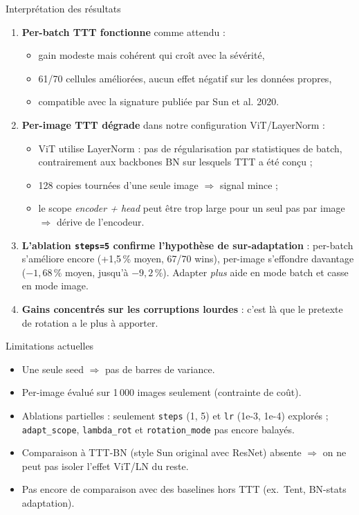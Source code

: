 \documentclass[10pt,aspectratio=169]{beamer}
\newcommand{\code}[1]{\texttt{\small #1}}
\begin{document}
\begin{frame}{Interprétation des résultats}
  \begin{enumerate}
    \item \textbf{Per-batch TTT fonctionne} comme attendu :
    \begin{itemize}\small
      \item gain modeste mais cohérent qui croît avec la sévérité,
      \item 61/70 cellules améliorées, aucun effet négatif sur les données propres,
      \item compatible avec la signature publiée par Sun et al. 2020.
    \end{itemize}

    \item \textbf{Per-image TTT dégrade} dans notre configuration ViT/LayerNorm :
    \begin{itemize}\small
      \item ViT utilise \alert{LayerNorm} : pas de régularisation par statistiques de batch, contrairement aux backbones BN sur lesquels TTT a été conçu ;
      \item 128 copies tournées d'une seule image $\Rightarrow$ signal mince ;
      \item le scope \emph{encoder + head} peut être trop large pour un seul pas par image $\Rightarrow$ dérive de l'encodeur.
    \end{itemize}

    \item \textbf{L'ablation \code{steps=5} confirme l'hypothèse de sur-adaptation} : per-batch s'améliore encore (+1,5\,\% moyen, 67/70 wins), per-image s'effondre davantage ($-1{,}68\,\%$ moyen, jusqu'à $-9{,}2\,\%$). Adapter \emph{plus} aide en mode batch et casse en mode image.

    \item \textbf{Gains concentrés sur les corruptions lourdes} : c'est là que le pretexte de rotation a le plus à apporter.
  \end{enumerate}
\end{frame}

\begin{frame}{Limitations actuelles}
  \begin{itemize}
    \item Une seule seed $\Rightarrow$ pas de barres de variance.
    \item Per-image évalué sur 1\,000 images seulement (contrainte de coût).
    \item Ablations partielles : seulement \code{steps} (1, 5) et \code{lr} (1e-3, 1e-4) explorés ; \code{adapt\_scope}, \code{lambda\_rot} et \code{rotation\_mode} pas encore balayés.
    \item Comparaison à TTT-BN (style Sun original avec ResNet) absente $\Rightarrow$ on ne peut pas isoler l'effet ViT/LN du reste.
    \item Pas encore de comparaison avec des baselines hors TTT (ex.~Tent, BN-stats adaptation).
  \end{itemize}
\end{frame}
\end{document}
